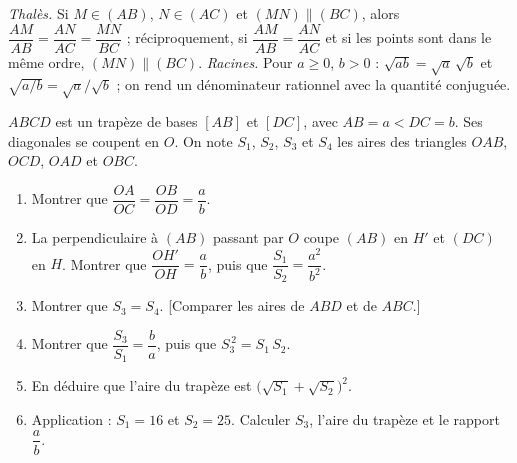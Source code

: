 \documentclass[12pt,a4paper]{article}
\begin{document}
\axmaketitle
\sommaire
\begin{rappels}
\emph{Thalès.} Si $M\in(AB)$, $N\in(AC)$ et $(MN)\parallel(BC)$, alors $\dfrac{AM}{AB}=\dfrac{AN}{AC}=\dfrac{MN}{BC}$ ;
réciproquement, si $\dfrac{AM}{AB}=\dfrac{AN}{AC}$ et si les points sont dans le même ordre, $(MN)\parallel(BC)$.
\emph{Racines.} Pour $a\geq0$, $b>0$ : $\sqrt{ab}=\sqrt a\,\sqrt b$ et $\sqrt{a/b}=\sqrt a/\sqrt b$ ; on rend un dénominateur
rationnel avec la quantité conjuguée.
\end{rappels}
\begin{exo}[title={Aires dans un trapèze}, stars=4]
$ABCD$ est un trapèze de bases $[AB]$ et $[DC]$, avec $AB=a<DC=b$. Ses diagonales se coupent en $O$. On note $S_1$, $S_2$, $S_3$ et $S_4$ les aires des triangles $OAB$, $OCD$, $OAD$ et $OBC$.

\begin{center}
\end{center}
\begin{enumerate}
  \item Montrer que $\dfrac{OA}{OC}=\dfrac{OB}{OD}=\dfrac ab$.
  \item La perpendiculaire à $(AB)$ passant par $O$ coupe $(AB)$ en $H'$ et $(DC)$ en $H$. Montrer que $\dfrac{OH'}{OH}=\dfrac ab$, puis que $\dfrac{S_1}{S_2}=\dfrac{a^2}{b^2}$.
  \item Montrer que $S_3=S_4$. [Comparer les aires de $ABD$ et de $ABC$.]
  \item Montrer que $\dfrac{S_3}{S_1}=\dfrac ba$, puis que $S_3^{\,2}=S_1\,S_2$.
  \item En déduire que l'aire du trapèze est $\big(\sqrt{S_1}+\sqrt{S_2}\big)^2$.
  \item Application : $S_1=16$ et $S_2=25$. Calculer $S_3$, l'aire du trapèze et le rapport $\dfrac ab$.
\end{enumerate}
\end{exo}
\end{document}
